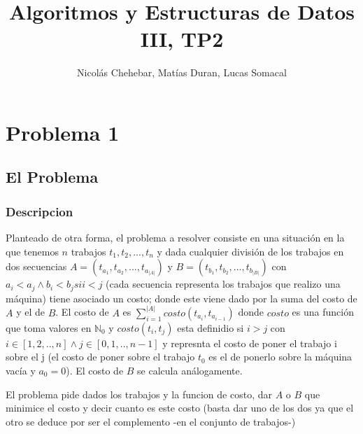 \documentclass[A4paper,oneside,fleqn,11pt]{article}
\title{Algoritmos y Estructuras de Datos III, TP2}
\author{Nicolás Chehebar, Matías Duran, Lucas Somacal}
\date{}
\theoremstyle{definition}
\newcommand{\NN}{\mathbb{N}}
\begin{document}
\maketitle
\tableofcontents
\clearpage

\section{Problema 1}
\subsection{El Problema}

\subsubsection{Descripcion}
Planteado de otra forma, el problema a resolver consiste en una situación en la que tenemos $n$ trabajos $t_{1},t_{2},...,t_{n}$ y dada cualquier división de los trabajos en dos secuencias $A=(t_{a_{1}},t_{a_{2}},..., t_{a_{|A|}})$ y $B=(t_{b_{1}}, t_{b_{2}},...,t_{b_{|B|}})$  con $a_{i}<a_{j} \land b_{i}<b_{j} si i<j$ (cada secuencia representa los trabajos que realizo una máquina) tiene asociado un costo; donde este viene dado por la suma del costo de $A$ y el de $B$. El costo de $A$ es  $\sum_{i=1}^{|A|} costo (t_{a_{i}},t_{a_{i-1}})$  donde $costo$ es una función que toma valores en $\NN_{0}$ y $costo(t_{i},t_{j})$ esta definidio si $i>j$ con $i \in [1,2,..,n] \land j \in [0,1,..,n-1]$ y represnta el costo de poner el trabajo i sobre el j (el costo de poner sobre el trabajo $t_{0}$ es el de ponerlo sobre la máquina vacía y $a_{0}=0$). El costo de $B$ se calcula análogamente. 

El problema pide dados los trabajos y la funcion de costo, dar $A$ o $B$ que minimice el costo y decir cuanto es este costo (basta dar uno de los dos ya que el otro se deduce por ser el complemento -en el conjunto de trabajos-)
\end{document}
